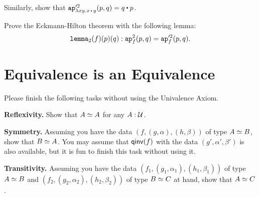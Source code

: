 \documentclass[12pt]{article}
\begin{document}
\begin{bonus}
  Similarly, show that $\ap'^2_{\lambda xy.x\concat y}(p,q) = q \concat p$.
\end{bonus}

\begin{task}
  Prove the Eckmann-Hilton theorem with the following lemma:
  \[
    \mathtt{lemma}_2(f)(p)(q) : \mathtt{ap}^2_f(p,q) = \mathtt{ap}'^2_f(p,q).
  \]
\end{task}

\section{Equivalence is an Equivalence}

Please finish the following tasks without using the Univalence Axiom.

\begin{task}
  \textbf{Reflexivity.} Show that $A \simeq A$ for any $A : \mathcal{U}$.
\end{task}

\begin{task}
  \textbf{Symmetry.}
  Assuming you have the data $(f,(g,\alpha),(h,\beta))$ of type $A \simeq B$, show that $B \simeq A$.
  You may assume that $\mathsf{qinv}(f)$ with the data $(g',\alpha',\beta')$ is also available,
  but it is fun to finish this task without using it.
\end{task}

\begin{task}  
\textbf{Transitivity.}
  Assuming you have
  the data
  $(f_1,(g_1,\alpha_1),(h_1,\beta_1))$ of type $A \simeq B$
  and
  $(f_2,(g_2,\alpha_2),(h_2,\beta_2))$ of type $B \simeq C$
  at hand,
  show that $A \simeq C$.
\end{task}
\end{document}
